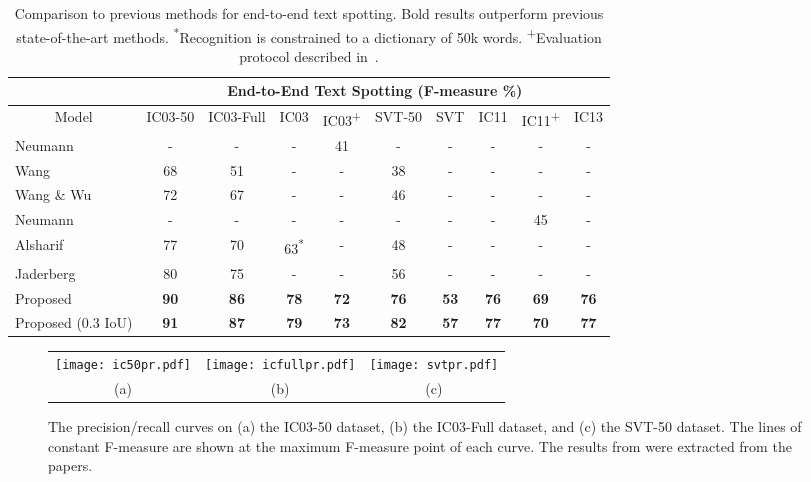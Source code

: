 \documentclass[twocolumn]{svjour3}          \smartqed  \usepackage{epsfig}
\begin{document}
\setlength{\tabcolsep}{3pt}
\begin{table*}[t]
\begin{center}
\begin{tabular}[t]{|l||c|c|c|c|c|c|c|c|c|}
\cline{2-10} 
\multicolumn{1}{c|}{\centering ~} & 
\multicolumn{9}{|c|}{\bf End-to-End Text Spotting (F-measure \%)}\\
\hline
\multicolumn{1}{|c||}{\centering Model} & 
\multicolumn{1}{c|}{\centering IC03-50} &
\multicolumn{1}{c|}{\centering IC03-Full} &
\multicolumn{1}{c|}{\centering IC03} &
\multicolumn{1}{c|}{\centering IC03\textsuperscript{+}} &
\multicolumn{1}{c|}{\centering SVT-50} &
\multicolumn{1}{c|}{\centering SVT} &
\multicolumn{1}{c|}{\centering IC11} &
\multicolumn{1}{c|}{\centering IC11\textsuperscript{+}} &
\multicolumn{1}{c|}{\centering IC13}\\
\hline\hline
Neumann~\cite{Neumann11} & - & - & - & 41 & - & - & - & - & -\\
\rowcolor{Gray}
Wang~\cite{Wang11} & 68 & 51 & - & - & 38 & - & - & - & -\\
Wang \& Wu~\cite{Wang12} & 72 & 67 & - & - & 46 & - & - & - & -\\
\rowcolor{Gray}
Neumann~\cite{Neumann13} & - & - & - & - & - & - & - & 45 & -\\
Alsharif~\cite{Alsharif13}  & 77 & 70 & 63\textsuperscript{*} & - & 48 & - & - & - & -\\
\rowcolor{Gray}
Jaderberg~\cite{Jaderberg14a}  & 80 & 75 & - & - & 56 & - & - & - & -\\
\hline
Proposed  & \bf 90 & \bf 86 & \bf 78 & \bf 72 & \bf 76 & \bf 53 & \bf 76 & \bf 69 & \bf 76\\
\rowcolor{Gray}
Proposed (0.3 IoU) & \bf 91 & \bf 87 & \bf 79 & \bf 73 & \bf 82 & \bf 57 & \bf 77 & \bf 70 & \bf 77\\
\hline
\end{tabular}
\end{center}
\vspace*{-1em}
\caption{\small Comparison to previous methods for end-to-end text spotting. Bold results outperform previous state-of-the-art methods. \textsuperscript{*}Recognition is constrained to a dictionary of 50k words. \textsuperscript{+}Evaluation protocol described in~\cite{Neumann13}.}
\label{table:spotting}
\end{table*}



\begin{figure*}
\begin{center}
\begin{tabular}{ccc}
\texttt{[image: ic50pr.pdf]}&
\texttt{[image: icfullpr.pdf]}&
\texttt{[image: svtpr.pdf]}\\
(a) & (b) & (c)
\end{tabular}
\caption{The precision/recall curves on (a) the IC03-50 dataset, (b) the IC03-Full dataset, and (c) the SVT-50 dataset. The lines of constant F-measure are shown at the maximum F-measure point of each curve. The results from \cite{Wang12,Alsharif13} were extracted from the papers.}
\label{fig:prcurves}
\end{center}
\end{figure*}
\end{document}
